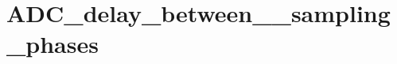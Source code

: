 \hypertarget{group___a_d_c__delay__between__2__sampling__phases}{\section{A\-D\-C\-\_\-delay\-\_\-between\-\_\-\_\-sampling\-\_\-phases}
\label{group___a_d_c__delay__between__2__sampling__phases}
}
